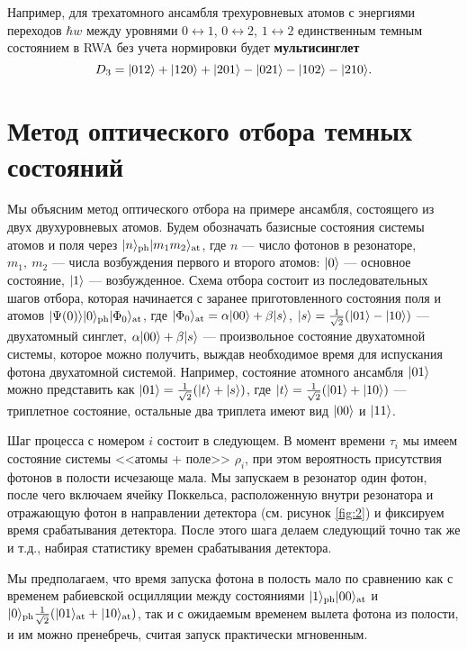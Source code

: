 Например, для трехатомного ансамбля трехуровневых атомов с энергиями переходов $\hbar w$ между уровнями $0 \leftrightarrow 1$, $0 \leftrightarrow 2$, $1 \leftrightarrow 2$ единственным темным состоянием в RWA \cite{ozhigov_qq,rwa_rabi_1,rwa_rabi_2} без учета нормировки будет \textbf{мультисинглет}
\[
	D_{3} = |012\rangle + |120\rangle + |201\rangle - |021\rangle - |102\rangle - |210\rangle.
\]

\section{Метод оптического отбора темных состояний}\label{sec:ch3/sect3}
Мы объясним метод оптического отбора на примере ансамбля, состоящего из двух двухуровневых атомов. Будем обозначать базисные состояния системы атомов и поля через $|n\rangle_{\text{ph}}|m_1m_2\rangle_{\text{at}}$, где $n$ --- число фотонов в резонаторе, $m_1,~m_2$ --- числа возбуждения первого и второго атомов: $|0\rangle$ --- основное состояние, $|1\rangle$ --- возбужденное. Схема отбора состоит из последовательных шагов отбора, которая начинается с заранее приготовленного состояния поля и атомов $|\Psi(0)\rangle|0\rangle_{\text{ph}}|\Phi_0\rangle_{\text{at}}$, где $|\Phi_{0}\rangle_{\text{at}}=\alpha |00\rangle+\beta |s\rangle$, $|s\rangle=\frac{1}{\sqrt{2}}(|01\rangle - |10\rangle)$ --- двухатомный синглет, $\alpha |00\rangle+\beta |s\rangle$ --- произвольное состояние двухатомной системы, которое можно получить, выждав необходимое время для испускания фотона двухатомной системой. Например, состояние атомного ансамбля $|01\rangle$ можно представить как $|01\rangle=\frac{1}{\sqrt 2}(|t\rangle+|s\rangle)$, где $|t\rangle=\frac{1}{\sqrt{2}}(|01\rangle+|10\rangle)$ --- триплетное состояние, остальные два триплета имеют вид $|00\rangle$ и $|11\rangle$. 

Шаг процесса с номером $i$ состоит в следующем. В момент времени $\tau_{i}$ мы имеем состояние системы <<атомы + поле>> $\rho_{i}$, при этом вероятность присутствия фотонов в полости исчезающе мала. Мы запускаем в резонатор один фотон, после чего включаем ячейку Поккельса, расположенную внутри резонатора и отражающую фотон в направлении детектора (см. рисунок \ref{fig:2}) и фиксируем время срабатывания детектора. После этого шага делаем следующий точно так же и т.д., набирая статистику времен срабатывания детектора. 

Мы предполагаем, что время запуска фотона в полость мало по сравнению как с временем  рабиевской осцилляции между состояниями $|1\rangle_{\text{ph}}|00\rangle_{\text{at}}$ и $|0\rangle_{\text{ph}}\frac{1}{\sqrt 2}(|01\rangle_{\text{at}}+|10\rangle_{\text{at}})$, так и с ожидаемым временем вылета фотона из полости, и им можно пренебречь, считая запуск практически мгновенным.

